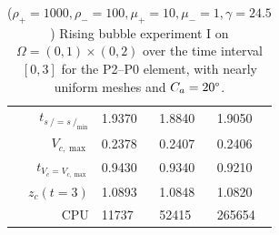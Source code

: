 \documentclass[a4paper,12pt,onecolumn]{article}
\newcommand{\strikes}{\mbox{$s\!\!\!\!\:/$}}
\begin{document}
\begin{table}
\begin{tabular}{rlll}
$t_{\strikes = \strikes_{\min}}$ & 1.9370 & 1.8840 & 1.9050 \\
$V_{c,\max}$                     & 0.2378 & 0.2407 & 0.2406 \\
$t_{V_c = V_{c,\max}}$           & 0.9430 & 0.9340 & 0.9210 \\
$z_c(t=3)$                       & 1.0893 & 1.0848 & 1.0820 \\
CPU                              &  11737 &  52415 & 265654 \\
\hline
\end{tabular}
\hspace*{-3.25cm}
\caption[Navier--Stokes rising bubble I benchmark values P2--P0]
{($\rho_+ = 1000,\rho_- = 100,\mu_+ = 10,\mu_- =1,\gamma = 24.5$)
Rising bubble experiment I on $\Omega = (0,1) \times (0,2)$ over the time
interval $[0,3]$ for the P2--P0 element, with nearly uniform meshes and
$C_a=20\degree$.}
\label{tab:risingbubbleIp2p0}
\end{table}
\end{document}
